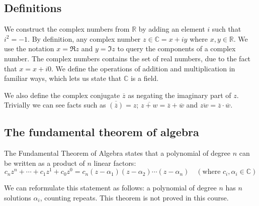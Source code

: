 \subsection{Definitions}
We construct the complex numbers from \(\mathbb R\) by adding an element \(i\) such that \(i^2 = -1\).
By definition, any complex number \(z \in \mathbb C = x + iy\) where \(x, y \in \mathbb R\).
We use the notation \(x = \Re z\) and \(y = \Im z\) to query the components of a complex number.
The complex numbers contains the set of real numbers, due to the fact that \(x = x + i0\).
We define the operations of addition and multiplication in familiar ways, which lets us state that \(\mathbb C\) is a field.

We also define the complex conjugate \(\overline{z}\) as negating the imaginary part of \(z\).
Trivially we can see facts such as \(\overline{\left( \overline{z}\right) } = z\); \(\overline{z + w} = \overline z + \overline w\) and \(\overline{zw} = \overline z \cdot \overline w\).

\subsection{The fundamental theorem of algebra}
The Fundamental Theorem of Algebra states that a polynomial of degree \(n\) can be written as a product of \(n\) linear factors:
\[
	c_n z^n + \cdots + c_1z^1 + c_0z^0 = c_n(z-\alpha_1)(z-\alpha_2) \cdots (z-\alpha_n)\quad (\text{where } c_i, \alpha_i \in \mathbb C)
\]

We can reformulate this statement as follows: a polynomial of degree \(n\) has \(n\) solutions \(\alpha_i\), counting repeats.
This theorem is not proved in this course.

